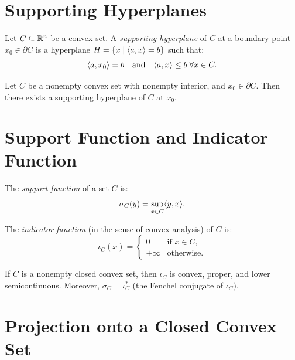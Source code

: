 \section{Supporting Hyperplanes}

\begin{definition}
Let $C \subseteq \mathbb{R}^n$ be a convex set. A \emph{supporting hyperplane} of $C$ at a
boundary point $x_0 \in \partial C$ is a hyperplane $H = \{x \mid \langle a, x \rangle = b\}$
such that:
\[
    \langle a, x_0 \rangle = b \quad \text{and} \quad
    \langle a, x \rangle \leq b \; \forall x \in C.
\]
\end{definition}

\begin{theorem}
Let $C$ be a nonempty convex set with nonempty interior, and $x_0 \in \partial C$.
Then there exists a supporting hyperplane of $C$ at $x_0$.
\end{theorem}

\section{Support Function and Indicator Function}

\begin{definition}
The \emph{support function} of a set $C$ is:
\[
    \sigma_C(y) = \sup_{x \in C} \langle y, x \rangle.
\]
\end{definition}

\begin{definition}
The \emph{indicator function} (in the sense of convex analysis) of $C$ is:
\[
    \iota_C(x) = \begin{cases} 0 & \text{if } x \in C, \\ +\infty & \text{otherwise.} \end{cases}
\]
\end{definition}

\begin{proposition}
If $C$ is a nonempty closed convex set, then $\iota_C$ is convex, proper, and lower
semicontinuous. Moreover, $\sigma_C = \iota_C^*$ (the Fenchel conjugate of $\iota_C$).
\end{proposition}

\section{Projection onto a Closed Convex Set}

